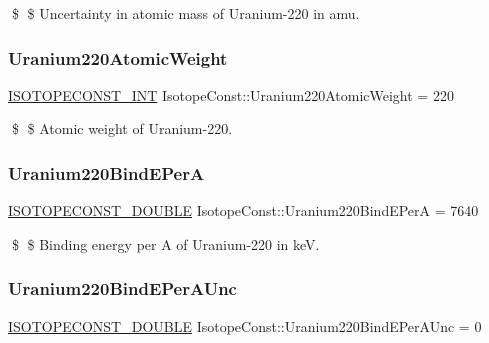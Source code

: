 \$ \$ Uncertainty in atomic mass of Uranium-\/220 in amu. \mbox{\label{group___isotope_const-_uranium-_u220_ga0593b453caf49757e37ffc108b9ffe56}} 
\subsubsection{\texorpdfstring{Uranium220\+Atomic\+Weight}{Uranium220AtomicWeight}}
{\footnotesize\ttfamily \mbox{\hyperlink{group___isotope_const-_macros_ga5f18360b3e99483a35c32d789e62621c}{I\+S\+O\+T\+O\+P\+E\+C\+O\+N\+S\+T\+\_\+\+I\+NT}} Isotope\+Const\+::\+Uranium220\+Atomic\+Weight = 220}

\$ \$ Atomic weight of Uranium-\/220. \mbox{\label{group___isotope_const-_uranium-_u220_gaf9889480a95b16de41e602a4ace70f17}} 
\subsubsection{\texorpdfstring{Uranium220\+Bind\+E\+PerA}{Uranium220BindEPerA}}
{\footnotesize\ttfamily \mbox{\hyperlink{group___isotope_const-_macros_ga8f45a7272ce02c0b4c65c44636ed719a}{I\+S\+O\+T\+O\+P\+E\+C\+O\+N\+S\+T\+\_\+\+D\+O\+U\+B\+LE}} Isotope\+Const\+::\+Uranium220\+Bind\+E\+PerA = 7640}

\$ \$ Binding energy per A of Uranium-\/220 in keV. \mbox{\label{group___isotope_const-_uranium-_u220_gae0924814690d7c29f607e8dcde5e4a92}} 
\subsubsection{\texorpdfstring{Uranium220\+Bind\+E\+Per\+A\+Unc}{Uranium220BindEPerAUnc}}
{\footnotesize\ttfamily \mbox{\hyperlink{group___isotope_const-_macros_ga8f45a7272ce02c0b4c65c44636ed719a}{I\+S\+O\+T\+O\+P\+E\+C\+O\+N\+S\+T\+\_\+\+D\+O\+U\+B\+LE}} Isotope\+Const\+::\+Uranium220\+Bind\+E\+Per\+A\+Unc = 0}

